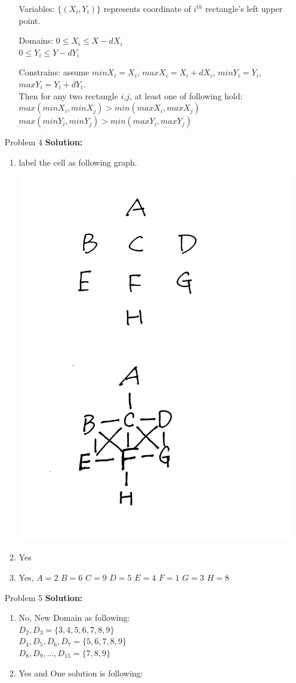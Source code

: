 \normalfont\documentclass[letterpaper,11pt]{article}
\begin{document}
\begin{enumerate}
	\begin{enumerate}
		\item[Variables:]
			$\{(X_i,Y_i)\}$ represents coordinate of $i^{th}$ rectangle's left upper point.
		\item[Domains:]
			$0 \le X_i \le X - dX_i$\\
			$0 \le Y_i \le Y - dY_i$
		\item[Constrains:]
			assume $minX_i = X_i$, $maxX_i = X_i +dX_i$, $minY_i = Y_i$, $maxY_i = Y_i +dY_i$.\\ Then for any two rectangle $i$,$j$,  at least one of following hold: \\
			$max(minX_i,minX_j) > min(maxX_i,maxX_j)$\\
			$max(minY_i,minY_j) > min(maxY_i,maxY_j)$
	\end{enumerate}	
\item[Problem 4]\textbf{Solution:}\par
	\begin{enumerate}
		\item label the cell as following graph. \par
			\includegraphics[width=2  in]{1.jpg}
		\item Yes
		\item Yes, $A = 2$ $B = 6$ $C = 9$ $D = 5$ $E= 4$ $F = 1$ $G = 3$ $H = 8$
	\end{enumerate}
\item[Problem 5]\textbf{Solution:}\par
	\begin{enumerate}
		\item No, New Domain as following:\\
		$D_2,D_3 = \{3,4,5,6,7,8,9\}$ \\
		$D_4,D_5,D_6,D_7 = \{5,6,7,8,9\}$ \\
		$D_8,D_9,...,D_{15} = \{7,8,9\}$
		\item Yes and One solution is following:\\

\end{enumerate}
\end{enumerate}
\end{document}
